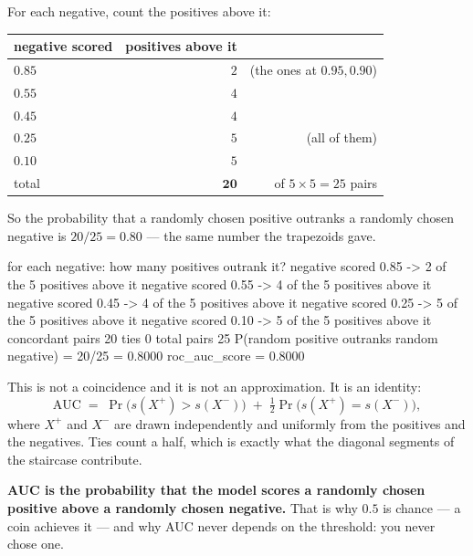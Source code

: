 \documentclass[11pt]{article}
\begin{document}
\begin{worked}
For each negative, count the positives above it:
\begin{center}\small
\begin{tabular}{@{}lrr@{}}
\toprule
negative scored & positives above it & \\
\midrule
$0.85$ & $2$ & (the ones at $0.95, 0.90$)\\
$0.55$ & $4$ &\\
$0.45$ & $4$ &\\
$0.25$ & $5$ & (all of them)\\
$0.10$ & $5$ &\\
\midrule
total  & $\mathbf{20}$ & of $5 \times 5 = 25$ pairs\\
\bottomrule
\end{tabular}
\end{center}
So the probability that a randomly chosen positive outranks a randomly chosen
negative is $20/25 = \mathbf{0.80}$ --- the same number the trapezoids gave.
\end{worked}

\begin{codeout}
for each negative: how many positives outrank it?
  negative scored 0.85  ->  2 of the 5 positives above it
  negative scored 0.55  ->  4 of the 5 positives above it
  negative scored 0.45  ->  4 of the 5 positives above it
  negative scored 0.25  ->  5 of the 5 positives above it
  negative scored 0.10  ->  5 of the 5 positives above it
concordant pairs 20   ties 0   total pairs 25
P(random positive outranks random negative) = 20/25 = 0.8000
roc_auc_score                               = 0.8000
\end{codeout}

This is not a coincidence and it is not an approximation. It is an identity:
\begin{equation}
\mathrm{AUC} \;=\; \Pr\!\big(s(X^{+}) > s(X^{-})\big)
              \;+\; \tfrac{1}{2}\Pr\!\big(s(X^{+}) = s(X^{-})\big),
\label{eq:aucprob}
\end{equation}
where $X^{+}$ and $X^{-}$ are drawn independently and uniformly from the
positives and the negatives. Ties count a half, which is exactly what the
diagonal segments of the staircase contribute.

\begin{keyidea}
\textbf{AUC is the probability that the model scores a randomly chosen positive
above a randomly chosen negative.} That is why $0.5$ is chance --- a coin
achieves it --- and why AUC never depends on the threshold: you never chose one.
\end{keyidea}
\end{document}
